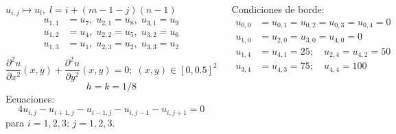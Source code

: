 \documentclass[9pt, aspectratio=169]{beamer}
\begin{document}
\begin{frame}
\begin{columns}
\cx
\begin{center}
\includegraphics[scale=1.1]{figs/malla-03.pdf}
\end{center}

$u_{i,j} \mapsto u_l,\; l = i + (m - 1 -j) (n - 1) $
\begin{align*}
    u_{1,1} &= u_7,\; u_{2,1} = u_8,\; u_{3,1} = u_{9} \\
    u_{1,2} &= u_4,\; u_{2,2} = u_5,\; u_{3,2} = u_{6} \\
    u_{1,3} &= u_1,\; u_{2,3} = u_2,\; u_{3,3} = u_{2} \\
\end{align*}
\cx
\[ \frac{\partial^2 u}{\partial x^2}(x, y) + \frac{\partial^2 u}{\partial y^2}(x, y) = 0; \;(x, y) \in [0, 0.5]^2 \]
\[ h = k = 1/8 \] \pause
Ecuaciones:
\[ 4 u_{i,j} - u_{i+1, j} - u_{i-1,j} -u_{i,j-1} -u_{i, j+1} = 0 \]
para $i = 1, 2, 3; \, j = 1, 2, 3$. \vspace{1em} \pause

Condiciones de borde:
\begin{align*}
    u_{0,0} &= u_{0,1} = u_{0,2} = u_{0,3} = u_{0, 4} = 0 \\
    u_{1,0} &= u_{2,0} = u_{3,0} = u_{4, 0} = 0 \\
    u_{1,4} &= u_{4,1} = 25; \quad u_{2,4} = u_{4,2} = 50 \\
    u_{3,4} &= u_{4,3} = 75; \quad u_{4,4} = 100
\end{align*}
\end{columns}
\end{frame}
\end{document}
